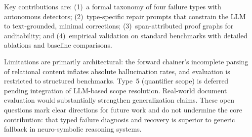 \documentclass[11pt,letterpaper]{article}
\begin{document}
Key contributions are: (1)~a formal taxonomy of four failure types with autonomous detectors; (2)~type-specific repair prompts that constrain the LLM to text-grounded, minimal corrections; (3)~span-attributed proof graphs for auditability; and (4)~empirical validation on standard benchmarks with detailed ablations and baseline comparisons.

Limitations are primarily architectural: the forward chainer's incomplete parsing of relational content inflates absolute hallucination rates, and evaluation is restricted to structured benchmarks. Type~5 (quantifier scope) is deferred pending integration of LLM-based scope resolution. Real-world document evaluation would substantially strengthen generalization claims. These open questions mark clear directions for future work and do not undermine the core contribution: that typed failure diagnosis and recovery is superior to generic fallback in neuro-symbolic reasoning systems.



\end{document}
